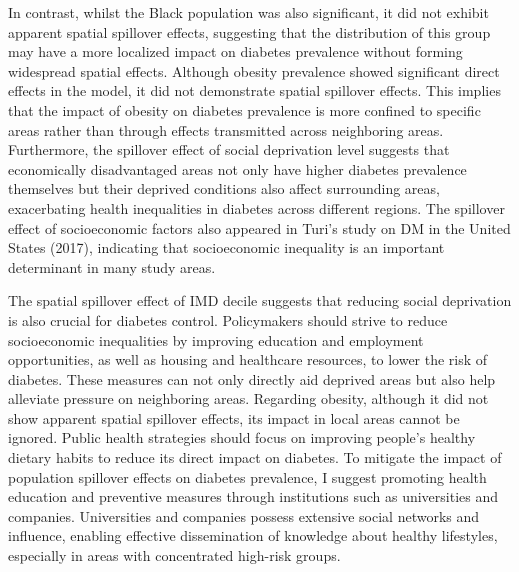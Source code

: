 In contrast, whilst the Black population was also significant, it did not exhibit apparent spatial spillover effects, suggesting that the distribution of this group may have a more localized impact on diabetes prevalence without forming widespread spatial effects. Although obesity prevalence showed significant direct effects in the model, it did not demonstrate spatial spillover effects. This implies that the impact of obesity on diabetes prevalence is more confined to specific areas rather than through effects transmitted across neighboring areas. Furthermore, the spillover effect of social deprivation level suggests that economically disadvantaged areas not only have higher diabetes prevalence themselves but their deprived conditions also affect surrounding areas, exacerbating health inequalities in diabetes across different regions. The spillover effect of socioeconomic factors also appeared in Turi's study on DM in the United States (2017), indicating that socioeconomic inequality is an important determinant in many study areas.

The spatial spillover effect of IMD decile suggests that reducing social deprivation is also crucial for diabetes control. Policymakers should strive to reduce socioeconomic inequalities by improving education and employment opportunities, as well as housing and healthcare resources, to lower the risk of diabetes. These measures can not only directly aid deprived areas but also help alleviate pressure on neighboring areas. Regarding obesity, although it did not show apparent spatial spillover effects, its impact in local areas cannot be ignored. Public health strategies should focus on improving people's healthy dietary habits to reduce its direct impact on diabetes. To mitigate the impact of population spillover effects on diabetes prevalence, I suggest promoting health education and preventive measures through institutions such as universities and companies. Universities and companies possess extensive social networks and influence, enabling effective dissemination of knowledge about healthy lifestyles, especially in areas with concentrated high-risk groups.


